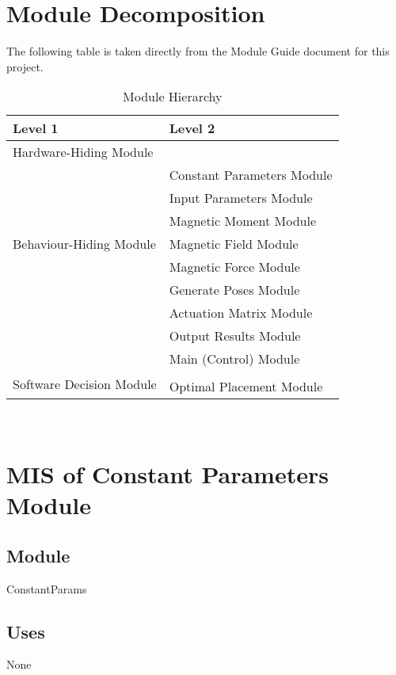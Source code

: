 \documentclass[12pt, titlepage]{article}
\begin{document}
\section{Module Decomposition}

The following table is taken directly from the Module Guide document for this project.

\begin{table}[h!]
\centering
\begin{tabular}{p{} p{}}
\toprule
\textbf{Level 1} & \textbf{Level 2}\\
\midrule

{Hardware-Hiding Module} & ~ \\
\midrule

\multirow{7}{0.3\textwidth}{Behaviour-Hiding Module} & Constant Parameters Module\\
& Input Parameters Module\\
& Magnetic Moment Module\\
& Magnetic Field Module\\
& Magnetic Force Module\\
& Generate Poses Module\\
& Actuation Matrix Module\\
& Output Results Module\\ 
& Main (Control) Module\\
\midrule

\multirow{3}{0.3\textwidth}{Software Decision Module} & \\
& Optimal Placement Module\\
\bottomrule

\end{tabular}
\caption{Module Hierarchy}
\label{TblMH}
\end{table}

\newpage
~\newpage

\section{MIS of Constant Parameters Module} \label{MISConsParam}
\subsection{Module}
ConstantParams

\subsection{Uses}
None
\end{document}
